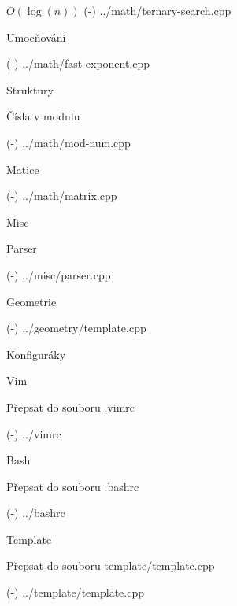 $O(\log(n))$
\verbinput (-) ../math/ternary-search.cpp

\sec Umocňování 

\verbinput (-) ../math/fast-exponent.cpp

\sec Struktury 

\secc Čísla v modulu 

\verbinput (-) ../math/mod-num.cpp

\secc Matice 

\verbinput (-) ../math/matrix.cpp

\newpage

\chap Misc

\sec Parser 

\verbinput (-) ../misc/parser.cpp

\newpage

\chap Geometrie

\verbinput (-) ../geometry/template.cpp

\newpage

\chap Konfiguráky

\sec Vim 

Přepsat do souboru .vimrc

\verbinput (-) ../vimrc

\sec Bash 

Přepsat do souboru .bashrc

\verbinput (-) ../bashrc

\sec Template 


Přepsat do souboru template/template.cpp

\verbinput (-) ../template/template.cpp

\bye
